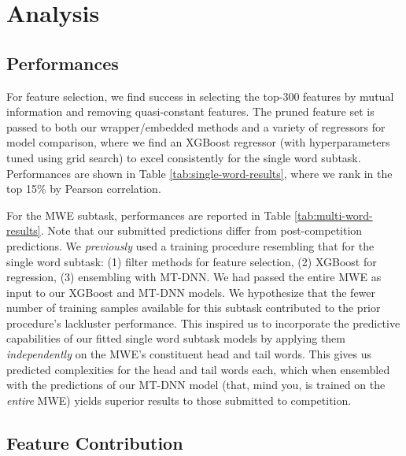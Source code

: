 \documentclass{dcthesis}
\theoremstyle{definition}
\theoremstyle{remark}
\begin{document}
\chapter{Analysis}

\section{Performances}

For feature selection, we find success in selecting the top-300 features by mutual information and removing quasi-constant features. The pruned feature set is passed to both our wrapper/embedded methods and a variety of regressors for model comparison, where we find an XGBoost regressor (with hyperparameters tuned using grid search) to excel consistently for the single word subtask. Performances are shown in Table \ref{tab:single-word-results}, where we rank in the top 15\% by Pearson correlation.

For the MWE subtask, performances are reported in Table \ref{tab:multi-word-results}. Note that our submitted predictions differ from post-competition predictions. We \textit{previously} used a training procedure resembling that for the single word subtask: (1) filter methods for feature selection, (2) XGBoost for regression, (3) ensembling with MT-DNN. We had passed the entire MWE as input to our XGBoost and MT-DNN models. We hypothesize that the fewer number of training samples available for this subtask contributed to the prior procedure's lackluster performance. This inspired us to incorporate the predictive capabilities of our fitted single word subtask models by applying them \textit{independently} on the MWE's constituent head and tail words. This gives us predicted complexities for the head and tail words each, which when ensembled with the predictions of our MT-DNN model (that, mind you, is trained on the \textit{entire} MWE) yields superior results to those submitted to competition.

\section{Feature Contribution}
\end{document}
